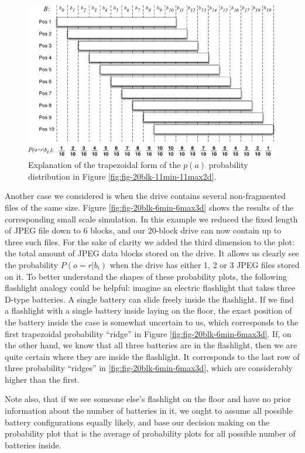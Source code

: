 \documentclass[final,5p,times,twocolumn,authoryear]{elsarticle}
\begin{document}
\begin{figure}
  \centerline{\includegraphics[width=\textwidth]{figures/pa_explain.pdf}}
  \caption{Explanation of the trapezoidal form of the $p(a)$ probability distribution in Figure \ref{fig:fig-20blk-11min-11max2d}.}
  \label{fig:pa_explan}
\end{figure}

Another case we considered is when the drive contains several non-fragmented files of the same size. Figure \ref{fig:fig-20blk-6min-6max3d} shows the results of the corresponding small scale simulation. In this example we reduced the fixed length of JPEG file down to 6 blocks, and our 20-block drive can now contain up to three such files. For the sake of clarity we added the third dimension to the plot: the total amount of JPEG data blocks stored on the drive. It allows us clearly see the probability $P(o=r|b_i)$ when the drive has either 1, 2 or 3 JPEG files stored on it. To better understand the shapes of these probability plots, the following flashlight analogy could be helpful: imagine an electric flashlight that takes three D-type batteries. A single battery can slide freely inside the flashlight. If we find a flashlight with a single battery inside laying on the floor, the exact position of the battery inside the case is somewhat uncertain to us, which corresponds to the first trapezoidal probability ``ridge'' in Figure \ref{fig:fig-20blk-6min-6max3d}. If, on the other hand, we know that all three batteries are in the flashlight, then we are quite certain where they are inside the flashlight. It corresponds to the last row of three probability ``ridges'' in \ref{fig:fig-20blk-6min-6max3d}, which are considerably higher than the first.

Note also, that if we see someone else's flashlight on the floor and have no prior information about the number of batteries in it, we ought to assume all possible battery configurations equally likely, and base our decision making on the probability plot that is the average of probability plots for all possible number of batteries inside.
\end{document}
